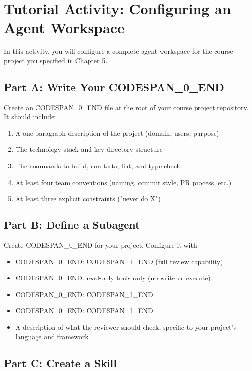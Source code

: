 \documentclass[11pt,a4paper]{book}
\begin{document}
\medskip

\section{Tutorial Activity: Configuring an Agent Workspace}

In this activity, you will configure a complete agent workspace for the course project you specified in Chapter 5.

\subsection{Part A: Write Your CODESPAN\_0\_END}

Create an CODESPAN\_0\_END file at the root of your course project repository. It should include:

\begin{enumerate}
  \item A one-paragraph description of the project (domain, users, purpose)
  \item The technology stack and key directory structure
  \item The commands to build, run tests, lint, and type-check
  \item At least four team conventions (naming, commit style, PR process, etc.)
  \item At least three explicit constraints ("never do X")
\end{enumerate}

\subsection{Part B: Define a Subagent}

Create CODESPAN\_0\_END for your project. Configure it with:

\begin{itemize}
  \item CODESPAN\_0\_END: CODESPAN\_1\_END (full review capability)
  \item CODESPAN\_0\_END: read-only tools only (no write or execute)
  \item CODESPAN\_0\_END: CODESPAN\_1\_END
  \item CODESPAN\_0\_END: CODESPAN\_1\_END
  \item A description of what the reviewer should check, specific to your project's language and framework
\end{itemize}

\subsection{Part C: Create a Skill}
\end{document}

